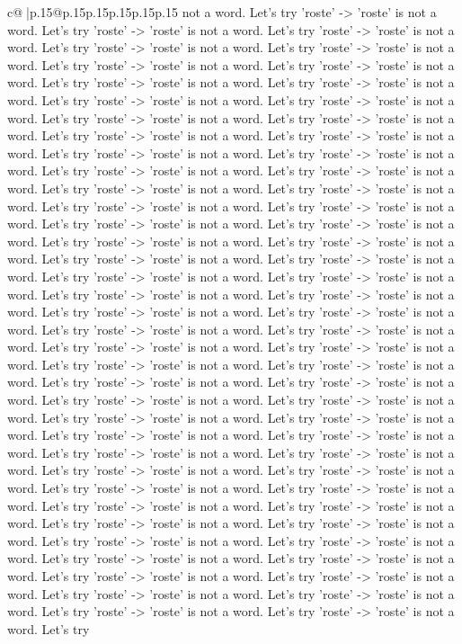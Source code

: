 \documentclass{article}
\begin{document}
{\begin{supertabular}{c@{$\;$}|p{.15\linewidth}@{}p{.15\linewidth}p{.15\linewidth}p{.15\linewidth}p{.15\linewidth}p{.15\linewidth}}
{{{not a word. Let's try 'roste' {-}> 'roste' is not a word. Let's try 'roste' {-}> 'roste' is not a word. Let's try 'roste' {-}> 'roste' is not a word. Let's try 'roste' {-}> 'roste' is not a word. Let's try 'roste' {-}> 'roste' is not a word. Let's try 'roste' {-}> 'roste' is not a word. Let's try 'roste' {-}> 'roste' is not a word. Let's try 'roste' {-}> 'roste' is not a word. Let's try 'roste' {-}> 'roste' is not a word. Let's try 'roste' {-}> 'roste' is not a word. Let's try 'roste' {-}> 'roste' is not a word. Let's try 'roste' {-}> 'roste' is not a word. Let's try 'roste' {-}> 'roste' is not a word. Let's try 'roste' {-}> 'roste' is not a word. Let's try 'roste' {-}> 'roste' is not a word. Let's try 'roste' {-}> 'roste' is not a word. Let's try 'roste' {-}> 'roste' is not a word. Let's try 'roste' {-}> 'roste' is not a word. Let's try 'roste' {-}> 'roste' is not a word. Let's try 'roste' {-}> 'roste' is not a word. Let's try 'roste' {-}> 'roste' is not a word. Let's try 'roste' {-}> 'roste' is not a word. Let's try 'roste' {-}> 'roste' is not a word. Let's try 'roste' {-}> 'roste' is not a word. Let's try 'roste' {-}> 'roste' is not a word. Let's try 'roste' {-}> 'roste' is not a word. Let's try 'roste' {-}> 'roste' is not a word. Let's try 'roste' {-}> 'roste' is not a word. Let's try 'roste' {-}> 'roste' is not a word. Let's try 'roste' {-}> 'roste' is not a word. Let's try 'roste' {-}> 'roste' is not a word. Let's try 'roste' {-}> 'roste' is not a word. Let's try 'roste' {-}> 'roste' is not a word. Let's try 'roste' {-}> 'roste' is not a word. Let's try 'roste' {-}> 'roste' is not a word. Let's try 'roste' {-}> 'roste' is not a word. Let's try 'roste' {-}> 'roste' is not a word. Let's try 'roste' {-}> 'roste' is not a word. Let's try 'roste' {-}> 'roste' is not a word. Let's try 'roste' {-}> 'roste' is not a word. Let's try 'roste' {-}> 'roste' is not a word. Let's try 'roste' {-}> 'roste' is not a word. Let's try 'roste' {-}> 'roste' is not a word. Let's try 'roste' {-}> 'roste' is not a word. Let's try 'roste' {-}> 'roste' is not a word. Let's try 'roste' {-}> 'roste' is not a word. Let's try 'roste' {-}> 'roste' is not a word. Let's try 'roste' {-}> 'roste' is not a word. Let's try 'roste' {-}> 'roste' is not a word. Let's try 'roste' {-}> 'roste' is not a word. Let's try 'roste' {-}> 'roste' is not a word. Let's try 'roste' {-}> 'roste' is not a word. Let's try 'roste' {-}> 'roste' is not a word. Let's try 'roste' {-}> 'roste' is not a word. Let's try 'roste' {-}> 'roste' is not a word. Let's try 'roste' {-}> 'roste' is not a word. Let's try 'roste' {-}> 'roste' is not a word. Let's try 'roste' {-}> 'roste' is not a word. Let's try 'roste' {-}> 'roste' is not a word. Let's try 'roste' {-}> 'roste' is not a word. Let's try 'roste' {-}> 'roste' is not a word. Let's try 'roste' {-}> 'roste' is not a word. Let's try 'roste' {-}> 'roste' is not a word. Let's try 'roste' {-}> 'roste' is not a word. Let's try 'roste' {-}> 'roste' is not a word. Let's try 'roste' {-}> 'roste' is not a word. Let's try 'roste' {-}> 'roste' is not a word. Let's try 'roste' {-}> 'roste' is not a word. Let's try 'roste' {-}> 'roste' is not a word. Let's try }}}
\end{supertabular}}
\end{document}
